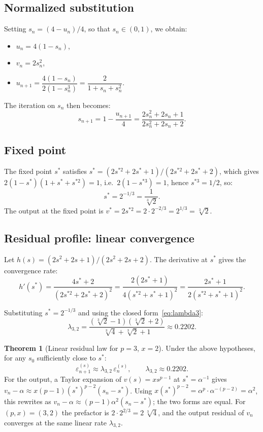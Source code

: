 \documentclass[11pt,a4paper]{article}
\theoremstyle{definition}
\newtheorem{theorem}{Theorem}[section]
\newcommand{\cbrt}[1]{\sqrt[3]{#1}}
\newcommand{\eps}{\varepsilon}
\begin{document}
\subsection{Normalized substitution}

Setting $s_n = (4 - u_n)/4$, so that $s_n \in (0,1)$, we obtain:
\begin{itemize}
  \item $u_n = 4(1 - s_n)$,
  \item $v_n = 2s_n^2$,
  \item $u_{n+1} = \dfrac{4(1-s_n)}{2(1-s_n^3)} = \dfrac{2}{1 + s_n + s_n^2}$.
\end{itemize}

The iteration on $s_n$ then becomes:
\begin{equation}
  \label{eq:iter_s3}
  s_{n+1} = 1 - \frac{u_{n+1}}{4} = \frac{2s_n^2 + 2s_n + 1}{2s_n^2 + 2s_n + 2}.
\end{equation}

\subsection{Fixed point}

The fixed point $s^*$ satisfies $s^* = (2s^{*2} + 2s^* + 1)/(2s^{*2} + 2s^* + 2)$, which gives $2(1-s^*)(1+s^*+s^{*2}) = 1$, i.e.\ $2(1-s^{*3}) = 1$, hence $s^{*3} = 1/2$, so:
\[
  s^* = 2^{-1/3} = \frac{1}{\cbrt{2}}.
\]
The output at the fixed point is $v^* = 2s^{*2} = 2 \cdot 2^{-2/3} = 2^{1/3} = \cbrt{2}$. \checkmark

\subsection{Residual profile: linear convergence}

Let $h(s) = (2s^2 + 2s + 1)/(2s^2 + 2s + 2)$. The derivative at $s^*$ gives the convergence rate:
\[
  h'(s^*) = \frac{4s^* + 2}{(2s^{*2} + 2s^* + 2)^2} = \frac{2(2s^*+1)}{4(s^{*2}+s^*+1)^2} = \frac{2s^*+1}{2(s^{*2}+s^*+1)^2}.
\]

Substituting $s^* = 2^{-1/3}$ and using the closed form~\eqref{eq:lambda3}:
\[
  \lambda_{3,2} = \frac{(\cbrt{2}-1)(\cbrt{2}+2)}{\cbrt{4}+\cbrt{2}+1} \approx 0.2202.
\]

\begin{theorem}[Linear residual law for $p=3$, $x=2$]
Under the above hypotheses, for any $s_0$ sufficiently close to $s^*$:
\[
  \eps_{n+1}^{(s)} \approx \lambda_{3,2}\,\eps_n^{(s)}, \qquad \lambda_{3,2} \approx 0.2202.
\]
For the output, a Taylor expansion of $v(s) = x s^{p-1}$ at $s^* = \alpha^{-1}$ gives $v_n - \alpha \approx x(p-1)(s^*)^{p-2}(s_n - s^*)$. Using $x(s^*)^{p-2} = \alpha^p \cdot \alpha^{-(p-2)} = \alpha^2$, this rewrites as $v_n - \alpha \approx (p-1)\alpha^2 (s_n - s^*)$; the two forms are equal. For $(p,x) = (3,2)$ the prefactor is $2 \cdot 2^{2/3} = 2\,\cbrt{4}$, and the output residual of $v_n$ converges at the same linear rate $\lambda_{3,2}$.
\end{theorem}
\end{document}
